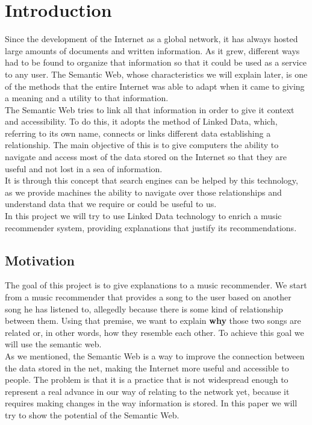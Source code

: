 \chapter{Introduction}
\label{cap:introduction}

Since the development of the Internet as a global network, it has always hosted large amounts of documents and written information. As it grew, different ways had to be found to organize that information so that it could be used as a service to any user. The Semantic Web, whose characteristics we will explain later, is one of the methods that the entire Internet was able to adapt when it came to giving a meaning and a utility to that information.\\

The Semantic Web tries to link all that information in order to give it context and accessibility. To do this, it adopts the method of Linked Data, which, referring to its own name, connects or links different data establishing a relationship. The main objective of this is to give computers the ability to navigate and access most of the data stored on the Internet so that they are useful and not lost in a sea of information.\\

It is through this concept that search engines can be helped by this technology, as we provide machines the ability to navigate over those relationships and understand data that we require or could be useful to us.\\

In this project we will try to use Linked Data technology to enrich a music recommender system, providing explanations that justify its recommendations.\\

\section{Motivation}

The goal of this project is to give explanations to a music recommender. We start from a music recommender that provides a song to the user based on another song he has listened to, allegedly because there is some kind of relationship between them. Using that premise, we want to explain \textbf{why} those two songs are related or, in other words, how they resemble each other. To achieve this goal we will use the semantic web.\\

As we mentioned, the Semantic Web is a way to improve the connection between the data stored in the net, making the Internet more useful and accessible to people. The problem is that it is a practice that is not widespread enough to represent a real advance in our way of relating to the network yet, because it requires making changes in the way information is stored. In this paper we will try to show the potential of the Semantic Web.\\

